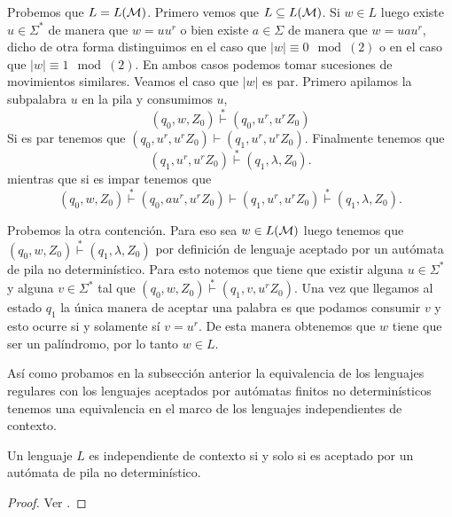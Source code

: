 \documentclass[tesis.tex]{subfiles}
\begin{document}
\begin{ej}
	
	Probemos que $L = L(\cal M)$.
	Primero vemos que $L \subseteq L(\cal M)$.
	Si $w \in L$ luego existe $u \in \Sigma^{*}$ de manera que $w = uu^r$ o bien existe $a \in \Sigma$ de manera que $w = uau^r$, dicho de otra forma distinguimos en el caso que $|w| \equiv 0 \mod (2)$ o en el caso que $|w| \equiv 1 \mod (2)$.
	En ambos casos podemos tomar sucesiones de movimientos similares.
	Veamos el caso que $|w|$ es par.
	Primero apilamos la subpalabra $u$ en la pila y consumimos $u$,
	\[
		(q_{0}, w, Z_{0}) \overset{*}{\vdash} (q_{0},u^r,u^rZ_{0})
	\]
	Si es par tenemos que $(q_{0},u^r,u^rZ_{0}) \vdash (q_{1},u^r,u^rZ_{0})$.
	Finalmente tenemos que 
	\[
		(q_{1},u^r,u^rZ_{0}) \overset{*}{\vdash} (q_{1},\lambda,Z_{0}).
	\] 
	mientras que si es impar tenemos que 
	\[
		(q_{0}, w, Z_{0}) \overset{*}{\vdash} (q_{0},au^r,u^rZ_{0}) \vdash (q_{1},u^r,u^rZ_{0})\overset{*}{\vdash} (q_{1},\lambda,Z_{0}).
	\] 	
	
	Probemos la otra contención.
	Para eso sea $w \in L(\cal M)$ luego tenemos que $(q_{0},w,Z_{0}) \overset{*}{\vdash} (q_{1},\lambda,Z_{0})$ por definición de lenguaje aceptado por un autómata de pila no determinístico.
	Para esto notemos que tiene que existir alguna $u \in \Sigma^*$ y alguna $v \in \Sigma^{*}$ tal que $(q_{0}, w, Z_{0}) \overset{*}{\vdash} (q_{1},v,u^rZ_{0})$.
	Una vez que llegamos al estado $q_{1}$ la única manera de aceptar una palabra es que podamos consumir $v$ y esto ocurre si y solamente sí $v = u^r$.
	De esta manera obtenemos que $w$ tiene que ser un palíndromo, por lo tanto $w \in L$.
	
	
\end{ej}

Así como probamos en la subsección anterior la equivalencia de los lenguajes regulares con los lenguajes aceptados por autómatas finitos no determinísticos tenemos una equivalencia en el marco de los lenguajes independientes de contexto.

\medskip

\begin{teo}\label{teo_ic_apnd}
	Un lenguaje $L$ es independiente de contexto si y solo si es aceptado por un autómata de pila no determinístico.
\end{teo}

\begin{proof}
	Ver \cite{hopcraft-ullman}.
\end{proof}
\end{document}
